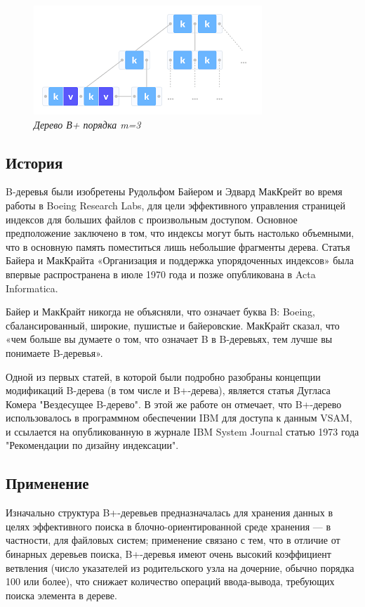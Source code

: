 \documentclass{article}
\begin{document}
\begin{figure}
\includegraphics{btree}
\caption{\textit{Дерево В+ порядка m=3}}
\end{figure}

\subsection{История}
B-деревья были изобретены Рудольфом Байером и Эдвард МакКрейт во время работы в Boeing Research Labs, для цели эффективного управления страницей индексов для больших файлов с произвольным доступом. Основное предположение заключено в том, что индексы могут быть настолько объемными, что в основную память поместиться лишь небольшие фрагменты дерева. Статья Байера и МакКрайта «Организация и поддержка упорядоченных индексов» была впервые распространена в июле 1970 года и позже опубликована в Acta Informatica.

Байер и МакКрайт никогда не объясняли, что означает буква B: Boeing, сбалансированный, широкие, пушистые и байеровские. МакКрайт сказал, что «чем больше вы думаете о том, что означает B в B-деревьях, тем лучше вы понимаете B-деревья».

Одной из первых статей, в которой были подробно разобраны концепции модификаций B-дерева (в том числе и B+-дерева), является статья Дугласа Комера "Вездесущее B-дерево". В этой же работе он отмечает, что B+-дерево использовалось в программном обеспечении IBM для доступа к данным VSAM, и ссылается на опубликованную в журнале IBM System Journal статью 1973 года "Рекомендации по дизайну индексации".

\subsection{Применение}
Изначально структура B+-деревьев предназначалась для хранения данных в целях эффективного поиска в блочно-ориентированной среде хранения — в частности, для файловых систем; применение связано с тем, что в отличие от бинарных деревьев поиска, B+-деревья имеют очень высокий коэффициент ветвления (число указателей из родительского узла на дочерние, обычно порядка 100 или более), что снижает количество операций ввода-вывода, требующих поиска элемента в дереве.
\end{document}
